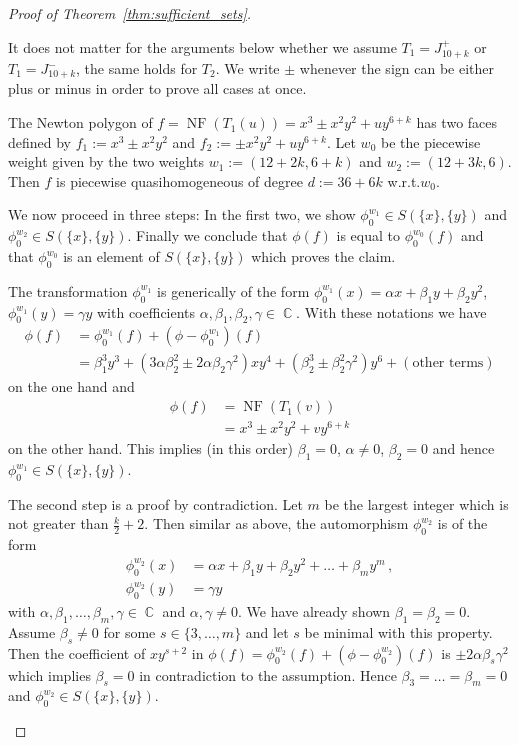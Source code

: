 \documentclass[noend]{amsproc}
\theoremstyle{definition}
\DeclareMathOperator{\C}{\mathbb{C}}
\DeclareMathOperator{\NF}{NF}
\begin{document}
\begin{proof}[Proof of Theorem~\ref{thm:sufficient_sets}]
\begin{description}[font=\normalfont\itshape,%
leftmargin=0cm,labelindent=\parindent]
It does not matter for the arguments below whether we assume $T_1 = J_{10+k}^+$
or $T_1 = J_{10+k}^-$, the same holds for $T_2$. We write $\pm$ whenever the
sign can be either plus or minus in order to prove all cases at once.

The Newton polygon of $f = \NF(T_1(u)) = x^3 \pm x^2 y^2 + uy^{6+k}$ has two
faces defined by $f_1 := x^3 \pm x^2 y^2$ and $f_2 := \pm x^2 y^2 + uy^{6+k}$.
Let $w_0$ be the piecewise weight given by the two weights
$w_1 := (12+2k, 6+k)$ and $w_2 := (12+3k, 6)$. Then $f$ is piecewise
quasihomogeneous of degree $d := 36+6k$ w.r.t.\@ $w_0$.

We now proceed in three steps: In the first two, we show
$\phi_0^{w_1} \in S(\{x\}, \{y\})$ and $\phi_0^{w_2} \in S(\{x\}, \{y\})$.
Finally we conclude that $\phi(f)$ is equal to $\phi_0^{w_0}(f)$ and that
$\phi_0^{w_0}$ is an element of $S(\{x\}, \{y\})$ which proves the claim.

The transformation $\phi_0^{w_1}$ is generically of the form
$\phi_0^{w_1}(x) = \alpha x + \beta_1 y + \beta_2 y^2$,
$\phi_0^{w_1}(y) = \gamma y$ with coefficients
$\alpha, \beta_1, \beta_2, \gamma \in \C$. With these notations we have
\begin{align*}
\phi(f)
&= \phi_0^{w_1}(f) + (\phi-\phi_0^{w_1})(f) \\
&= \beta_1^3 y^3 + (3\alpha\beta_2^2 \pm 2\alpha\beta_2\gamma^2) xy^4
+ (\beta_2^3 \pm \beta_2^2\gamma^2) y^6 + (\text{other terms})
\end{align*}
on the one hand and
\begin{align*}
\phi(f)
&= \NF(T_1(v)) \\
&= x^3 \pm x^2 y^2 + vy^{6+k}
\end{align*}
on the other hand. This implies (in this order) $\beta_1 = 0$, $\alpha \neq 0$,
$\beta_2 = 0$ and hence $\phi_0^{w_1} \in S(\{x\}, \{y\})$.

The second step is a proof by contradiction. Let $m$ be the largest integer
which is not greater than $\frac{k}{2}+2$. Then similar as above, the
automorphism $\phi_0^{w_2}$ is of the form
\begin{align*}
\phi_0^{w_2}(x)
&= \alpha x + \beta_1 y + \beta_2 y^2 + \ldots + \beta_m y^m \,, \\
\phi_0^{w_2}(y) &= \gamma y
\end{align*}
with $\alpha, \beta_1, \ldots, \beta_m, \gamma \in \C$ and
$\alpha, \gamma \neq 0$. We have already shown $\beta_1 = \beta_2 = 0$. Assume
$\beta_s \neq 0$ for some $s \in \{3, \ldots, m\}$ and let $s$ be minimal with
this property. Then the coefficient of $xy^{s+2}$ in
$\phi(f) = \phi_0^{w_2}(f) + (\phi-\phi_0^{w_2})(f)$ is
$\pm 2\alpha\beta_s\gamma^2$ which implies $\beta_s = 0$ in contradiction to
the assumption. Hence $\beta_3 = \ldots = \beta_m = 0$ and
$\phi_0^{w_2} \in S(\{x\}, \{y\})$.


\end{description}
\end{proof}
\end{document}
